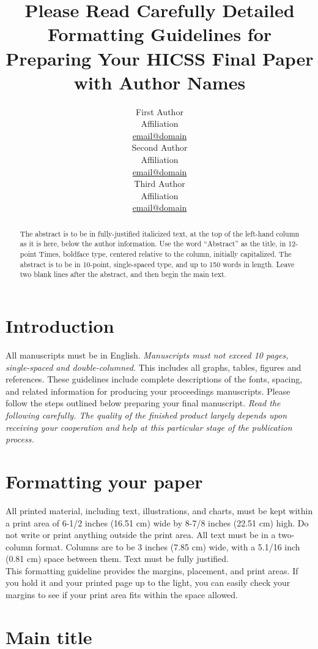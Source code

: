 \documentclass[10pt]{article}
\title{Please Read Carefully Detailed Formatting Guidelines for Preparing Your HICSS Final Paper with Author Names}
\author{First Author \\
  Affiliation \\
  {\underline{ email@domain}} \\\And
  Second Author \\
  Affiliation \\
  {\underline{ email@domain} }\\\And 
  Third Author \\
  Affiliation \\
  {\underline{email@domain}} \\}
\date{}
\begin{document}
\maketitle
\begin{abstract}
The abstract is to be in fully-justified italicized text, at the top of the left-hand column as it is here, below the author information. Use the word “Abstract” as the title, in 12-point Times, boldface type, centered relative to the column, initially capitalized. The abstract is to be in 10-point, single-spaced type, and up to 150 words in length. Leave two blank lines after the abstract, and then begin the main text. 

\end{abstract}

\section{Introduction}

All manuscripts must be in English. {\em Manuscripts must not exceed 10 pages, single-spaced and double-columned}.  This includes all graphs, tables, figures and references. These guidelines include complete descriptions of the fonts, spacing, and related information for producing your proceedings manuscripts. Please follow the steps outlined below preparing your final manuscript. {\em Read the following carefully. The quality of the finished product largely depends upon receiving your cooperation and help at this particular stage of the publication process.}


\section{Formatting your paper}

All printed material, including text, illustrations, and charts, must be kept within a print area of 6-1/2 inches (16.51 cm) wide by 8-7/8 inches (22.51 cm) high. Do not write or print anything outside the print area. All text must be in a two-column format. Columns are to be 3 inches (7.85 cm) wide, with a 5.1/16 inch (0.81 cm) space between them. Text must be fully justified. \\
This formatting guideline provides the margins, placement, and print areas. If you hold it and your printed page up to the light, you can easily check your margins to see if your print area fits within the space allowed.

\section{Main title}
\end{document}
